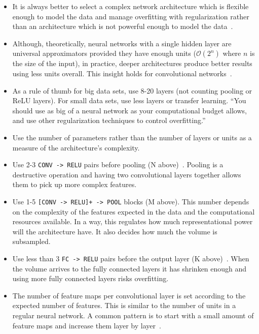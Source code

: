 \begin{itemize}
	\item It is always better to select a complex network architecture which is flexible enough to model the data and manage overfitting with regularization rather than an architecture which is not powerful enough to model the data~\cite{Ng2014, Krizhevsky2012}. 

	\item Although, theoretically, neural networks with a single hidden layer are universal approximators provided they have enough units ($\mathcal{O}(2^n)$ where $n$ is the size of the input), in practice, deeper architectures produce better results using less units overall. This insight holds for convolutional networks~\cite{Bengio2014}.

	\item As a rule of thumb for big data sets, use 8-20 layers (not counting pooling or ReLU layers). For small data sets, use less layers or transfer learning. ``You should use as big of a neural network as your computational budget allows, and use other regularization techniques to control overfitting.''~\cite{Karpathy2015}

	\item Use the number of parameters rather than the number of layers or units as a measure of the architecture's complexity.

	\item Use 2-3 \texttt{CONV -> RELU} pairs before pooling (N above)~\cite{Karpathy2015}. Pooling is a destructive operation and having two convolutional layers together allows them to pick up more complex features.

	\item Use 1-5 \texttt{[CONV -> RELU]+ -> POOL} blocks (M above). This number depends on the complexity of the features expected in the data and the computational resources available. In a way, this regulates how much representational power will the architecture have. It also decides how much the volume is subsampled.

	\item Use less than 3 \texttt{FC -> RELU} pairs before the output layer (K above)~\cite{Karpathy2015}. When the volume arrives to the fully connected layers it has shrinken enough and using more fully connected layers risks overfitting.

	\item The number of feature maps per convolutional layer is set according to the expected number of features. This is similar to the number of units in a regular neural network. A common pattern is to start with a small amount of feature maps and increase them layer by layer~\cite{Simonyan2014}. %


\end{itemize}
